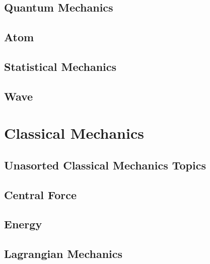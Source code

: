 \documentclass[10pt]{report}
\begin{document}
\section{Quantum Mechanics}

\clearpage

\section{Atom}

\clearpage

\clearpage

\section{Statistical Mechanics}

\clearpage

\section{Wave}

\clearpage

\chapter{Classical Mechanics}\clearpage

\section{Unasorted Classical Mechanics Topics}
\clearpage
\clearpage

\section{Central Force}
\clearpage

\section{Energy}
\clearpage

\section{Lagrangian Mechanics}
\clearpage
\clearpage
\end{document}
